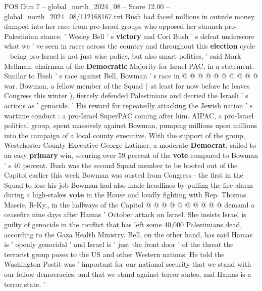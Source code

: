 \begin{textsample}{POS Dim 7 – global\_north\_2024\_08 – Score 12.00 – global\_north\_2024\_08/112168167.txt}
Bush had faced millions in outside money dumped into her race from pro-Israel groups who opposed her staunch pro-Palestinian stance. ' Wesley Bell ' s \textbf{victory} and Cori Bush ' s defeat underscore what we ' ve seen in races across the country and throughout this \textbf{election} cycle -- being pro-Israel is not just wise policy, but also smart politics, ' said Mark Mellman, chairman of the \textbf{Democratic} Majority for Israel PAC, in a statement.
Similar to Bush ' s race against Bell, Bowman ' s race in @ @ @ @ @ @ @ @ @ @ war.
Bowman, a fellow member of the Squad ( at least for now before he leaves Congress this winter ), fiercely defended Palestinians and decried the Israeli ' s actions as ' genocide. ' His reward for repeatedly attacking the Jewish nation ' s wartime conduct : a pro-Israel SuperPAC coming after him.
AIPAC, a pro-Israel political group, spent massively against Bowman, pumping millions upon millions into the campaign of a local county executive.
With the support of the group, Westchester County Executive George Latimer, a moderate \textbf{Democrat}, sailed to an easy \textbf{primary} win, securing over 59 percent of the \textbf{vote} compared to Bowman ' s 40 percent.
Bush was the second Squad member to be booted out of the Capitol earlier this week Bowman was ousted from Congress - the first in the Squad to lose his job Bowman had also made headlines by pulling the fire alarm during a high-stakes \textbf{vote} in the House and loudly fighting with Rep.
Thomas Massie, R-Ky., in the hallways of the Capitol @ @ @ @ @ @ @ @ @ @ demand a ceasefire nine days after Hamas ' October attack on Israel.
She insists Israel is guilty of genocide in the conflict that has left some 40,000 Palestinians dead, according to the Gaza Health Ministry.
Bell, on the other hand, has said Hamas is ' openly genocidal ' and Israel is ' just the front door ' of the threat the terrorist group poses to the US and other Western nations.
He told the Washington Postit was ' important for our national security that we stand with our fellow democracies, and that we stand against terror states, and Hamas is a terror state. '

\end{textsample}
